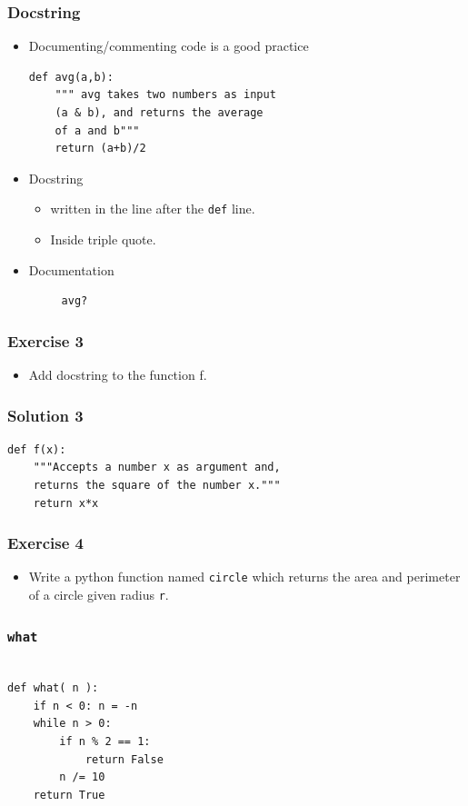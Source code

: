 \documentclass[presentation]{beamer}
\begin{document}
\begin{frame}[fragile]
\frametitle{Docstring}
\label{sec-8}



\begin{itemize}
\item Documenting/commenting code is a good practice
\lstset{language=Python}
\begin{lstlisting}
def avg(a,b):
    """ avg takes two numbers as input 
    (a & b), and returns the average 
    of a and b"""
    return (a+b)/2
\end{lstlisting}
\item Docstring
\begin{itemize}
\item written in the line after the \verb~def~ line.
\item Inside triple quote.
\end{itemize}
\item Documentation
\begin{verbatim}
     avg?
\end{verbatim}

\end{itemize}
\end{frame}
\begin{frame}
\frametitle{Exercise 3}
\label{sec-9}


\begin{itemize}
\item Add docstring to the function f.
\end{itemize}
\end{frame}
\begin{frame}[fragile]
\frametitle{Solution 3}
\label{sec-10}

\lstset{language=Python}
\begin{lstlisting}
def f(x):
    """Accepts a number x as argument and,
    returns the square of the number x."""
    return x*x
\end{lstlisting}
\end{frame}
\begin{frame}
\frametitle{Exercise 4}
\label{sec-11}


\begin{itemize}
\item Write a python function named \verb~circle~ which returns the area and
  perimeter of a circle given radius \verb~r~.
\end{itemize}
\end{frame}
\begin{frame}[fragile]
\frametitle{\verb~what~}
\label{sec-12}

\lstset{language=Python}
\begin{lstlisting}

def what( n ):
    if n < 0: n = -n
    while n > 0:
        if n % 2 == 1:
            return False
        n /= 10
    return True
\end{lstlisting}
\end{frame}
\end{document}
